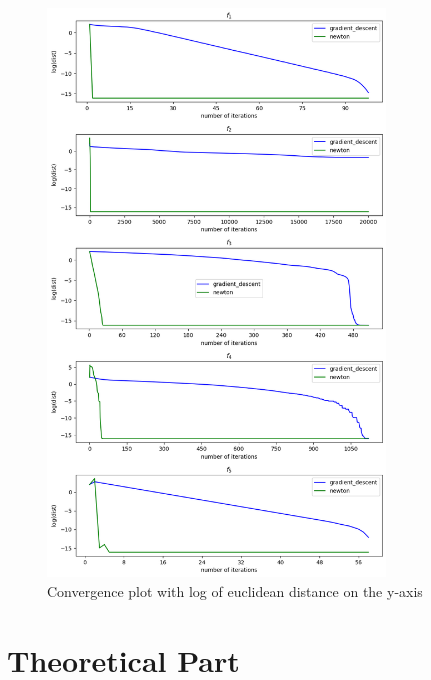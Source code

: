 \documentclass[a4paper]{article}
\begin{document}
\begin{figure}[]
    \centering
    \includegraphics[width=0.8\textwidth]{plt_dist100.png}
    \caption{Convergence plot with log of euclidean distance on the y-axis}
  \label{plt2}
\end{figure}

\section{Theoretical Part}
\end{document}
